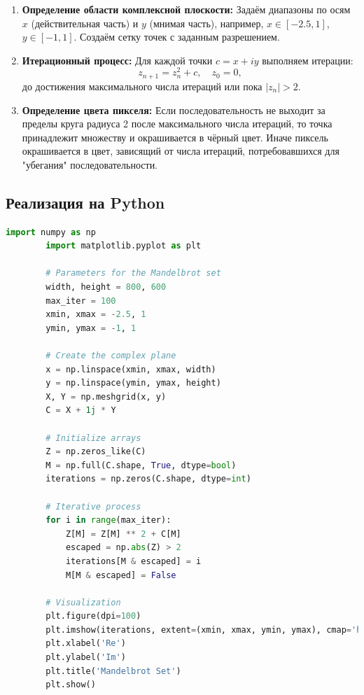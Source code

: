 \documentclass{article}
\begin{document}
	\begin{enumerate}
		\item \textbf{Определение области комплексной плоскости:} Задаём диапазоны по осям $x$ (действительная часть) и $y$ (мнимая часть), например, $x \in [-2.5, 1]$, $y \in [-1, 1]$. Создаём сетку точек с заданным разрешением.
		\item \textbf{Итерационный процесс:} Для каждой точки $c = x + iy$ выполняем итерации:
		\begin{equation}
			z_{n+1} = z_n^2 + c, \quad z_0 = 0,
		\end{equation}
		до достижения максимального числа итераций или пока $|z_n| > 2$.
		\item \textbf{Определение цвета пикселя:} Если последовательность не выходит за пределы круга радиуса 2 после максимального числа итераций, то точка принадлежит множеству и окрашивается в чёрный цвет. Иначе пиксель окрашивается в цвет, зависящий от числа итераций, потребовавшихся для "убегания" последовательности.
	\end{enumerate}
	
	\subsection{Реализация на Python}
	
	
	\begin{lstlisting}[language=Python, inputencoding=utf8]
		import numpy as np
		import matplotlib.pyplot as plt
		
		# Parameters for the Mandelbrot set
		width, height = 800, 600
		max_iter = 100
		xmin, xmax = -2.5, 1
		ymin, ymax = -1, 1
		
		# Create the complex plane
		x = np.linspace(xmin, xmax, width)
		y = np.linspace(ymin, ymax, height)
		X, Y = np.meshgrid(x, y)
		C = X + 1j * Y
		
		# Initialize arrays
		Z = np.zeros_like(C)
		M = np.full(C.shape, True, dtype=bool)
		iterations = np.zeros(C.shape, dtype=int)
		
		# Iterative process
		for i in range(max_iter):
			Z[M] = Z[M] ** 2 + C[M]
			escaped = np.abs(Z) > 2
			iterations[M & escaped] = i
			M[M & escaped] = False
		
		# Visualization
		plt.figure(dpi=100)
		plt.imshow(iterations, extent=(xmin, xmax, ymin, ymax), cmap='hot')
		plt.xlabel('Re')
		plt.ylabel('Im')
		plt.title('Mandelbrot Set')
		plt.show()
	\end{lstlisting}
	
\end{document}
